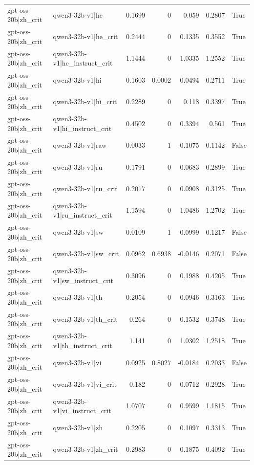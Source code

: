 \begin{table}
\begin{tabular}{l l r r r r l}
gpt-oss-20b|zh_crit & qwen3-32b-v1|he & 0.1699 & 0 & 0.059 & 0.2807 & True \\
gpt-oss-20b|zh_crit & qwen3-32b-v1|he_crit & 0.2444 & 0 & 0.1335 & 0.3552 & True \\
gpt-oss-20b|zh_crit & qwen3-32b-v1|he_instruct_crit & 1.1444 & 0 & 1.0335 & 1.2552 & True \\
gpt-oss-20b|zh_crit & qwen3-32b-v1|hi & 0.1603 & 0.0002 & 0.0494 & 0.2711 & True \\
gpt-oss-20b|zh_crit & qwen3-32b-v1|hi_crit & 0.2289 & 0 & 0.118 & 0.3397 & True \\
gpt-oss-20b|zh_crit & qwen3-32b-v1|hi_instruct_crit & 0.4502 & 0 & 0.3394 & 0.561 & True \\
gpt-oss-20b|zh_crit & qwen3-32b-v1|raw & 0.0033 & 1 & -0.1075 & 0.1142 & False \\
gpt-oss-20b|zh_crit & qwen3-32b-v1|ru & 0.1791 & 0 & 0.0683 & 0.2899 & True \\
gpt-oss-20b|zh_crit & qwen3-32b-v1|ru_crit & 0.2017 & 0 & 0.0908 & 0.3125 & True \\
gpt-oss-20b|zh_crit & qwen3-32b-v1|ru_instruct_crit & 1.1594 & 0 & 1.0486 & 1.2702 & True \\
gpt-oss-20b|zh_crit & qwen3-32b-v1|sw & 0.0109 & 1 & -0.0999 & 0.1217 & False \\
gpt-oss-20b|zh_crit & qwen3-32b-v1|sw_crit & 0.0962 & 0.6938 & -0.0146 & 0.2071 & False \\
gpt-oss-20b|zh_crit & qwen3-32b-v1|sw_instruct_crit & 0.3096 & 0 & 0.1988 & 0.4205 & True \\
gpt-oss-20b|zh_crit & qwen3-32b-v1|th & 0.2054 & 0 & 0.0946 & 0.3163 & True \\
gpt-oss-20b|zh_crit & qwen3-32b-v1|th_crit & 0.264 & 0 & 0.1532 & 0.3748 & True \\
gpt-oss-20b|zh_crit & qwen3-32b-v1|th_instruct_crit & 1.141 & 0 & 1.0302 & 1.2518 & True \\
gpt-oss-20b|zh_crit & qwen3-32b-v1|vi & 0.0925 & 0.8027 & -0.0184 & 0.2033 & False \\
gpt-oss-20b|zh_crit & qwen3-32b-v1|vi_crit & 0.182 & 0 & 0.0712 & 0.2928 & True \\
gpt-oss-20b|zh_crit & qwen3-32b-v1|vi_instruct_crit & 1.0707 & 0 & 0.9599 & 1.1815 & True \\
gpt-oss-20b|zh_crit & qwen3-32b-v1|zh & 0.2205 & 0 & 0.1097 & 0.3313 & True \\
gpt-oss-20b|zh_crit & qwen3-32b-v1|zh_crit & 0.2983 & 0 & 0.1875 & 0.4092 & True \\

\end{tabular}
\end{table}
